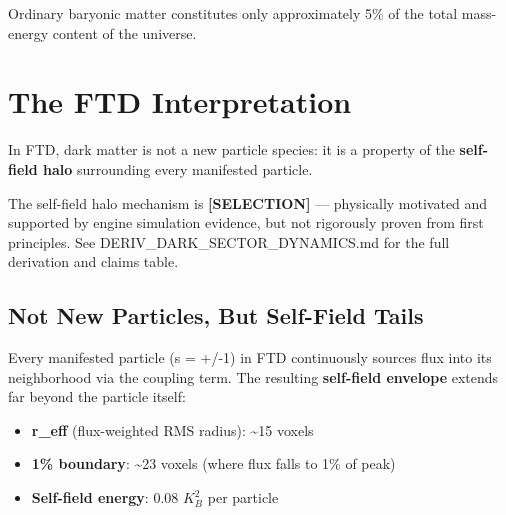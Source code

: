 \documentclass[
  11pt,
  letterpaper,
  twoside,
  openright]{book}
\providecommand{\tightlist}{%
  \setlength{\itemsep}{0pt}\setlength{\parskip}{0pt}}
\begin{document}
Ordinary baryonic matter constitutes only approximately 5\% of the total
mass-energy content of the universe.

\section{The FTD Interpretation}\label{the-ftd-interpretation}

In FTD, dark matter is not a new particle species: it is a property of
the \textbf{self-field halo} surrounding every manifested particle.

\begin{tcolorbox}[enhanced jigsaw, leftrule=.75mm, title=\textcolor{quarto-callout-warning-color}{\faExclamationTriangle}\hspace{0.5em}{Epistemic Status}, bottomrule=.15mm, opacityback=0, coltitle=black, arc=.35mm, colframe=quarto-callout-warning-color-frame, colbacktitle=quarto-callout-warning-color!10!white, colback=white, titlerule=0mm, breakable, bottomtitle=1mm, toptitle=1mm, rightrule=.15mm, toprule=.15mm, left=2mm, opacitybacktitle=0.6]

The self-field halo mechanism is \textbf{{[}SELECTION{]}} --- physically
motivated and supported by engine simulation evidence, but not
rigorously proven from first principles. See
DERIV\_DARK\_SECTOR\_DYNAMICS.md for the full derivation and claims
table.

\end{tcolorbox}

\subsection{Not New Particles, But Self-Field
Tails}\label{not-new-particles-but-self-field-tails}

Every manifested particle (s = +/-1) in FTD continuously sources flux
into its neighborhood via the coupling term. The resulting
\textbf{self-field envelope} extends far beyond the particle itself:

\begin{itemize}
\tightlist
\item
  \textbf{r\_eff} (flux-weighted RMS radius): \textasciitilde15 voxels
\item
  \textbf{1\% boundary}: \textasciitilde23 voxels (where flux falls to
  1\% of peak)
\item
  \textbf{Self-field energy}: 0.08 \(K_B^2\) per particle
\end{itemize}
\end{document}
